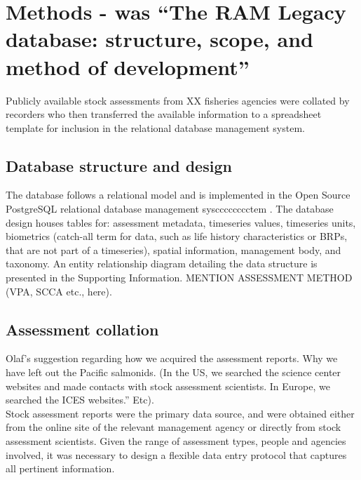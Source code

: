 \documentclass[letterpaper,12pt]{article}
\begin{document}
\newpage
\section{Methods - was ``The RAM Legacy database: structure, scope, and method of development''}

Publicly available stock assessments from XX fisheries
agencies were collated by recorders who then transferred the available information to a spreadsheet template for inclusion in
the relational database management system.

\subsection{Database structure and design}
The database follows a relational model and is implemented in the Open
Source PostgreSQL relational database management syscccccccctem \citep{postgresql:2009}. The database design houses tables
for: assessment metadata, timeseries values, timeseries units,
biometrics (catch-all term for data, such as life history characteristics or BRPs, that are not part of a timeseries), spatial information, management body, and taxonomy. An entity
relationship diagram detailing the data structure is presented in the
Supporting Information. MENTION ASSESSMENT METHOD (VPA, SCCA etc., here).

\subsection{Assessment collation}
Olaf's suggestion regarding how we acquired the assessment reports. Why we have left out the Pacific salmonids. (In the US, we searched the science center websites and made contacts with stock assessment scientists.  In Europe, we searched the ICES websites.”  Etc).\\
Stock assessment reports were the primary data source, and were
obtained either from the online site of the relevant management agency
or directly from stock assessment scientists. Given the range of
assessment types, people and agencies involved, it was necessary to
design a flexible data entry protocol that captures all pertinent
information.
\end{document}
